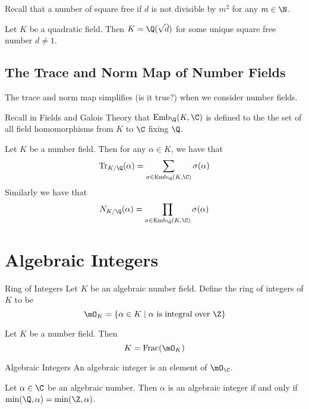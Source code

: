 \documentclass[a4paper]{article}
\begin{document}
Recall that a number of square free if $d$ is not divisible by $m^2$ for any $m\in\N$. 

\begin{lmm}{}{} Let $K$ be a quadratic field. Then $K=\Q(\sqrt{d})$ for some unique square free number $d\neq 1$. 
\end{lmm}

\subsection{The Trace and Norm Map of Number Fields}
The trace and norm map simplifies (is it true?) when we consider number fields. 

Recall in Fields and Galois Theory that $\text{Emb}_\Q(K,\C)$ is defined to the the set of all field homomorphisms from $K$ to $\C$ fixing $\Q$. 

\begin{prp}{}{} Let $K$ be a number field. Then for any $\alpha\in K$, we have that $$\text{Tr}_{K/\Q}(\alpha)=\sum_{\sigma\in\text{Emb}_\Q(K,\C)}\sigma(\alpha)$$ Similarly we have that $$N_{K/\Q}(\alpha)=\prod_{\sigma\in\text{Emb}_\Q(K,\C)}\sigma(\alpha)$$
\end{prp}

\pagebreak
\section{Algebraic Integers}
\begin{defn}{Ring of Integers}{} Let $K$ be an algebraic number field. Define the ring of integers of $K$ to be $$\mO_K=\{\alpha\in K\;|\;\alpha\text{ is integral over }\Z\}$$ 
\end{defn}

\begin{lmm}{}{} Let $K$ be a number field. Then $$K=\text{Frac}(\mO_K)$$
\end{lmm}

\begin{defn}{Algebraic Integers}{} An algebraic integer is an element of $\mO_\C$. 
\end{defn}

\begin{prp}{}{} Let $\alpha\in\C$ be an algebraic number. Then $\alpha$ is an algebraic integer if and only if $\min(\Q,\alpha)=\min(\Z,\alpha)$. 
\end{prp}
\end{document}

